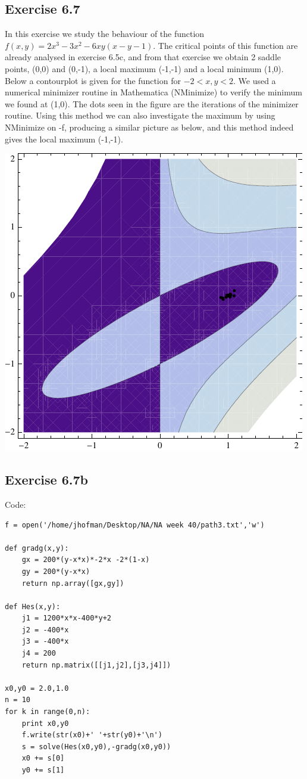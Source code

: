 \documentclass[10pt,a4paper]{article}
\begin{document}
\subsection*{Exercise 6.7}

\noindent In this exercise we study the behaviour of the function $f(x,y) = 2x^3 - 3x^2 -6xy(x-y-1)$. The critical points of this function are already analysed in exercise 6.5c, and from that exercise we obtain 2 saddle points, (0,0) and (0,-1), a local maximum (-1,-1) and a local minimum (1,0). Below a contourplot is given for the function for $-2 < x,y < 2$. We used a numerical minimizer routine in Mathematica (NMinimize) to verify the minimum we found at (1,0). The dots seen in the figure are the iterations of the minimizer routine. Using this method we can also investigate the maximum by using NMinimize on -f, producing a similar picture as below, and this method indeed gives the local maximum (-1,-1).\\
\begin{center}
\includegraphics{plot.pdf}
 \end{center}
 
\subsection*{Exercise 6.7b}
Code:
\begin{lstlisting}
f = open('/home/jhofman/Desktop/NA/NA week 40/path3.txt','w')

def gradg(x,y):
    gx = 200*(y-x*x)*-2*x -2*(1-x)
    gy = 200*(y-x*x)
    return np.array([gx,gy])

def Hes(x,y):
    j1 = 1200*x*x-400*y+2
    j2 = -400*x
    j3 = -400*x
    j4 = 200
    return np.matrix([[j1,j2],[j3,j4]])

x0,y0 = 2.0,1.0
n = 10
for k in range(0,n):
    print x0,y0
    f.write(str(x0)+' '+str(y0)+'\n')
    s = solve(Hes(x0,y0),-gradg(x0,y0))
    x0 += s[0]
    y0 += s[1]
\end{lstlisting}
\end{document}

